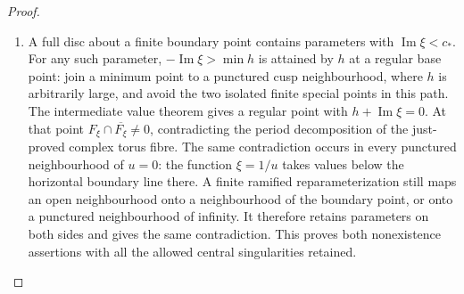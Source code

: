 \documentclass[11pt,a4paper]{article}
\theoremstyle{definition}
\begin{document}
\begin{proof}
\begin{enumerate}[label=\arabic*.]
\item A full disc about a finite boundary point contains parameters
with $\operatorname{Im}\xi<c_*$. For any such parameter,
$-\operatorname{Im}\xi>\min h$ is attained by $h$ at a
regular base point: join a minimum point to a punctured
cusp neighbourhood, where $h$ is arbitrarily large, and
avoid the two isolated finite special points in this path.
The intermediate value theorem gives a regular point with
$h+\operatorname{Im}\xi=0$. At that point
$F_\xi\cap\overline{F_\xi}\ne0$, contradicting the period
decomposition of the just-proved complex torus fibre.
The same contradiction occurs in every punctured
neighbourhood of $u=0$: the function $\xi=1/u$ takes
values below the horizontal boundary line there. A finite
ramified reparameterization still maps an open neighbourhood
onto a neighbourhood of the boundary point, or onto a
punctured neighbourhood of infinity. It therefore retains
parameters on both sides and gives the same contradiction.
This proves both nonexistence assertions with all the
allowed central singularities retained.

\end{enumerate}
\end{proof}
\end{document}
